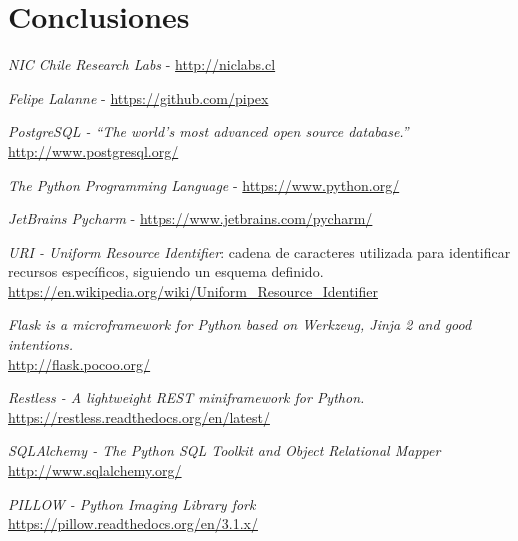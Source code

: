 \documentclass[11pt,letterpaper]{article}
\begin{document}
\section{Conclusiones}
\newpage
\begin{thebibliography}{5}
     \emph{NIC Chile Research Labs} - \url{http://niclabs.cl}

     \emph{Felipe Lalanne} - \url{https://github.com/pipex}

     \emph{PostgreSQL - ``The world's most advanced open source database.''}\\ \url{http://www.postgresql.org/}

     \emph{The Python Programming Language} - \url{https://www.python.org/}

     \emph{JetBrains Pycharm} - \url{https://www.jetbrains.com/pycharm/}

     \emph{URI - Uniform Resource Identifier}: cadena de caracteres utilizada para identificar recursos específicos, siguiendo un esquema definido.\\ \url{https://en.wikipedia.org/wiki/Uniform_Resource_Identifier}

	 \emph{Flask is a microframework for Python based on Werkzeug, Jinja 2 and good intentions.}\\ \url{http://flask.pocoo.org/}

     \emph{Restless - A lightweight REST miniframework for Python.}\\ \url{https://restless.readthedocs.org/en/latest/}

    \emph{SQLAlchemy - The Python SQL Toolkit and Object Relational Mapper}\\ \url{http://www.sqlalchemy.org/}

    \emph{PILLOW - Python Imaging Library fork}\\ \url{https://pillow.readthedocs.org/en/3.1.x/}
\end{thebibliography}

\end{document}
